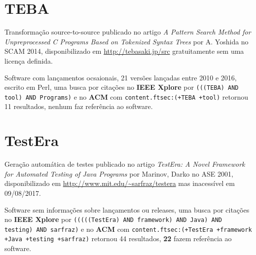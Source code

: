 \section{TEBA}

Transformação source-to-source
publicado no artigo {\it A Pattern Search Method for Unpreprocessed C Programs Based on Tokenized Syntax Trees}
por A. Yoshida
no SCAM 2014,
disponibilizado em \url{http://tebasaki.jp/src}
gratuitamente
sem uma licença definida.

Software com lançamentos ocsaionais,
21 versões lançadas
entre 2010 e 2016,
escrito em Perl,
uma busca por citações no {\bf IEEE Xplore} por
\texttt{(((TEBA) AND tool) AND Programs)}
e no {\bf ACM} com
\texttt{content.ftsec:(+TEBA +tool)}
retornou
11 resultados,
nenhum faz referência ao software.


\section{TestEra}

Geração automática de testes
publicado no artigo {\it TestEra: A Novel Framework for Automated Testing of Java Programs}
por Marinov, Darko
no ASE 2001,
disponibilizado em \url{http://www.mit.edu/~sarfraz/testera}
mas inacessível em 09/08/2017.

Software sem informações sobre lançamentos ou releases,
uma busca por citações no {\bf IEEE Xplore} por
\texttt{(((((TestEra) AND framework) AND Java) AND testing) AND sarfraz)}
e no {\bf ACM} com
\texttt{content.ftsec:(+TestEra +framework +Java +testing +sarfraz)}
retornou
44 resultados,
{\bf 22} fazem referência ao software.

